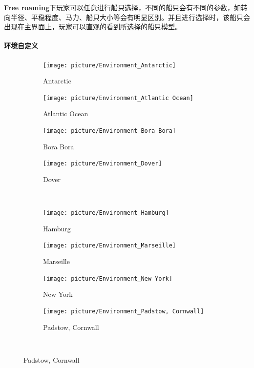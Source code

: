 \documentclass[letterpaper,10pt]{article}
\begin{document}
				\textbf{Free roaming}下玩家可以任意进行船只选择，不同的船只会有不同的参数，如转向半径、平稳程度、马力、船只大小等会有明显区别。并且进行选择时，该船只会出现在主界面上，玩家可以直观的看到所选择的船只模型。
				
				\paragraph{环境自定义}
				
				\begin{figure}[htbp] 
					\centering 
					
					\begin{subfigure}{0.24\textwidth}
						\texttt{[image: picture/Environment\_Antarctic]}
						\captionsetup{font=scriptsize}
						\caption{Antarctic}
						\label{fig: Environment_Antarctic}
					\end{subfigure}
					\begin{subfigure}{0.24\textwidth}
						\texttt{[image: picture/Environment\_Atlantic Ocean]}
						\captionsetup{font=scriptsize}
						\caption{Atlantic Ocean}
						\label{fig: Environment_Atlantic Ocean}
					\end{subfigure}
					\begin{subfigure}{0.24\textwidth}
						\texttt{[image: picture/Environment\_Bora Bora]}
						\captionsetup{font=scriptsize}
						\caption{Bora Bora}
						\label{fig: Environment_Bora Bora}	
					\end{subfigure}
					\begin{subfigure}{0.24\textwidth}
						\texttt{[image: picture/Environment\_Dover]}
						\captionsetup{font=scriptsize}
						\caption{Dover}
						\label{fig: Environment_Dover}	
					\end{subfigure} \\

					\begin{subfigure}{0.24\textwidth}
						\texttt{[image: picture/Environment\_Hamburg]}
						\captionsetup{font=scriptsize}
						\caption{Hamburg}
						\label{fig: Environment_Hamburg}
					\end{subfigure}
					\begin{subfigure}{0.24\textwidth}
						\texttt{[image: picture/Environment\_Marseille]}
						\captionsetup{font=scriptsize}
						\caption{Marseille}
						\label{fig: Environment_Marseille}
					\end{subfigure}
					\begin{subfigure}{0.24\textwidth}
						\texttt{[image: picture/Environment\_New York]}
						\captionsetup{font=scriptsize}
						\caption{New York}
						\label{fig: Environment_New York}	
					\end{subfigure}
					\begin{subfigure}{0.24\textwidth}
						\texttt{[image: picture/Environment\_Padstow, Cornwall]}
						\captionsetup{font=scriptsize}
						\caption{Padstow, Cornwall}
						\label{fig: Environment_Padstow, Cornwall}	
					\end{subfigure} \\


\end{figure}
\end{document}
